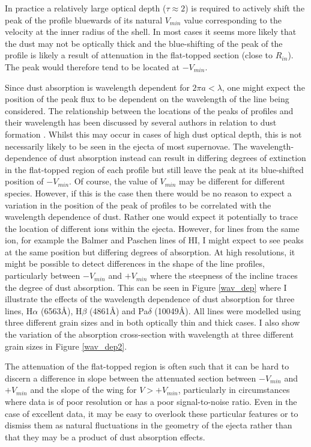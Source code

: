 In practice a relatively large optical depth ($\tau \approx 2$) is 
required to actively shift the peak of the profile bluewards of its natural 
$V_{min}$ value corresponding to the velocity at the inner radius of the shell.  In most cases it seems more likely that the dust
may not be optically thick and the blue-shifting of the peak of the profile is 
likely a result of attenuation in the flat-topped section (close to 
$R_{in}$).  The peak would therefore tend to be located at $-V_{min}$.

Since dust absorption is wavelength dependent for $2\pi a < \lambda$, one might expect the 
position of the peak flux to be dependent on the wavelength of the line being 
considered.  The relationship between the locations of the peaks 
of profiles and their wavelength has been discussed by several authors in 
relation to dust formation \citep{Smith2012, Fransson2013, Gall2014}.  Whilst this may occur in cases of high dust 
optical depth, this is not necessarily likely to be seen in the ejecta of 
most supernovae.  The wavelength-dependence of dust absorption instead 
can result in differing degrees of extinction in the flat-topped region of 
each profile but still leave the peak at its blue-shifted position of 
$-V_{min}$.  Of course, the value of $V_{min}$ may be different for 
different species.  However, if this is the case then there would be no 
reason to expect a variation in the position of the peak of profiles to be 
correlated with the wavelength dependence of dust.  Rather one would 
expect it potentially to trace the location of different ions within the ejecta. 
However, for lines from the same ion, for example the Balmer and Paschen lines of HI,
I might expect to see peaks at the same position but differing degrees of absorption.
At high resolutions, it might be possible to detect differences in the shape of the line 
profiles, particularly between $-V_{min}$ and $+V_{min}$ where the steepness of the 
incline traces the degree of dust absorption.  This can be seen in Figure \ref{wav_dep} 
where I illustrate the effects of the wavelength dependence of dust absorption for 
three lines, H$\alpha$ (6563\AA), H$\beta$ (4861\AA) and Pa$\delta$ (10049\AA).  
All lines were modelled using three different grain sizes and in both optically thin and 
thick cases.  I also show the variation of the absorption cross-section with 
wavelength at three different grain sizes in Figure \ref{wav_dep2}.

The attenuation of the flat-topped region is  often such that it can 
be hard to discern a difference in slope between the attenuated 
section between $-V_{min}$ and $+V_{min}$ and the slope of the wing for 
$V>+V_{min}$, particularly in circumstances where data is of poor 
resolution or has a poor signal-to-noise ratio.  Even in the case of 
excellent data, it may be easy to overlook these particular features or to 
dismiss them as natural fluctuations in the geometry of the ejecta rather than 
that they may be a product of dust absorption effects.

